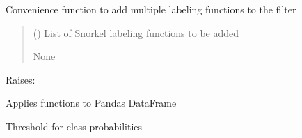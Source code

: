 \documentclass[letterpaper,10pt,english]{sphinxmanual}
\begin{document}
\begin{fulllineitems}
\begin{fulllineitems}
\label{\detokenize{filters:at_nlp.filters.string_filter.StringFilter.add_multiple_labeling_fns}}
\pysigstartsignatures
{}
\pysigstopsignatures
\sphinxAtStartPar
Convenience function to add multiple labeling functions to the filter
\begin{quote}\begin{description}
\sphinxAtStartPar
{} (\sphinxstyleliteralemphasis{\sphinxupquote{{[}}}\sphinxstyleliteralemphasis{\sphinxupquote{{]}}}) \textendash{} List of Snorkel labeling functions to be added

\sphinxAtStartPar
None

\end{description}\end{quote}

\sphinxAtStartPar
Raises:

\end{fulllineitems}


\begin{fulllineitems}
\label{\detokenize{filters:at_nlp.filters.string_filter.StringFilter.applier}}
\pysigstartsignatures
{}
\pysigstopsignatures
\sphinxAtStartPar
Applies functions to Pandas DataFrame

\end{fulllineitems}


\begin{fulllineitems}
\label{\detokenize{filters:at_nlp.filters.string_filter.StringFilter.class_likelihood}}
\pysigstartsignatures
{}
\pysigstopsignatures
\sphinxAtStartPar
Threshold for class probabilities


\end{fulllineitems}
\end{fulllineitems}
\end{document}

